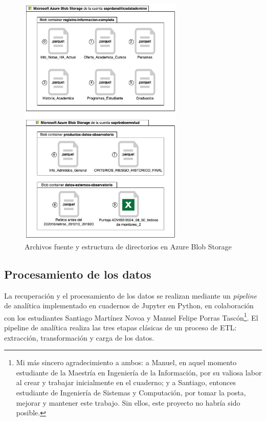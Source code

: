 \begin{figure}[h]
	\centering
	\includegraphics[width=0.7\textwidth]{img/blob_storage.jpg}
	\caption{Archivos fuente y estructura de directorios en Azure Blob Storage}
	\label{fig:blob_storage}
\end{figure}

\subsection{Procesamiento de los datos}

La recuperación y el procesamiento de los datos se realizan mediante un \textit{pipeline} de analítica implementado en cuadernos de Jupyter en Python, en colaboración con los estudiantes Santiago Martínez Novoa y Manuel Felipe Porras Tascón\footnote{Mi más sincero agradecimiento a ambos: a Manuel, en aquel momento estudiante de la Maestría en Ingeniería de la Información, por su valiosa labor al crear y trabajar inicialmente en el cuaderno; y a Santiago, entonces estudiante de Ingeniería de Sistemas y Computación, por tomar la posta, mejorar y mantener este trabajo. Sin ellos, este proyecto no habría sido posible.}.
El pipeline de analítica realiza las tres etapas clásicas de un proceso de \gls{ETL}: extracción, transformación y carga de los datos.


